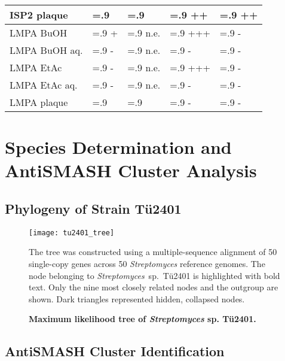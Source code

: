 \begin{table}[htbp]
\begin{tabularx}{\textwidth}{>{\hsize=1.4\hsize}X>{\hsize=.9\hsize}X>{\hsize=.9\hsize}X>{\hsize=.9\hsize}X>{\hsize=.9\hsize}X}
            ISP2 plaque     &       &       & ++    & ++   \\
            \midrule
            LMPA BuOH       & +     & n.e.  & +++   & -    \\
            LMPA BuOH aq.   & -     & n.e.  & -     & -    \\
            LMPA EtAc       & -     & n.e.  & +++   & -    \\
            LMPA EtAc aq.   & -     & n.e.  & -     & -    \\
            LMPA plaque     &       &       & -     & -    \\
            \bottomrule
        \end{tabularx}
    \end{table}


\section{Species Determination and AntiSMASH Cluster Analysis} %
\label{sec:species_antismash}

    \subsection{Phylogeny of Strain Tü2401} %
    \label{sub:phylogeny_of_strain_tue2401}

	\begin{figure}[htbp]
		\texttt{[image: tu2401\_tree]}
		\caption[Maximum likelihood tree of \emph{Streptomyces} sp. Tü2401.]{\textbf{Maximum likelihood tree of \emph{Streptomyces} sp. Tü2401.}} The tree was constructed using a multiple-sequence alignment of 50 single-copy genes across 50 \textit{Streptomyces} reference genomes. The node belonging to \textit{Streptomyces}~sp.~Tü2401 is highlighted with bold text. Only the nine most closely related nodes and the outgroup are shown. Dark triangles represented hidden, collapsed nodes.
		\label{fig:phylo_tree} 
	\end{figure}


    \subsection{AntiSMASH Cluster Identification} %
    \label{sub:antismash_cluster_identification}

